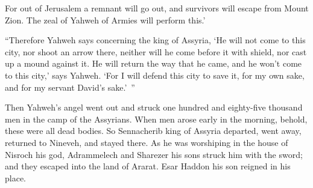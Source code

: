 {For out of Jerusalem a remnant will go out, and survivors will escape from Mount Zion. The zeal of Yahweh of Armies will perform this.’
\par }{\PP {}“Therefore Yahweh says concerning the king of Assyria, ‘He will not come to this city, nor shoot an arrow there, neither will he come before it with shield, nor cast up a mound against it.
He will return the way that he came, and he won’t come to this city,’ says Yahweh.
‘For I will defend this city to save it, for my own sake, and for my servant David’s sake.’ ”
\par }{\PP {}Then Yahweh’s angel went out and struck one hundred and eighty-five thousand men in the camp of the Assyrians. When men arose early in the morning, behold, these were all dead bodies.
So Sennacherib king of Assyria departed, went away, returned to Nineveh, and stayed there.
As he was worshiping in the house of Nisroch his god, Adrammelech and Sharezer his sons struck him with the sword; and they escaped into the land of Ararat. Esar Haddon his son reigned in his place.

}
